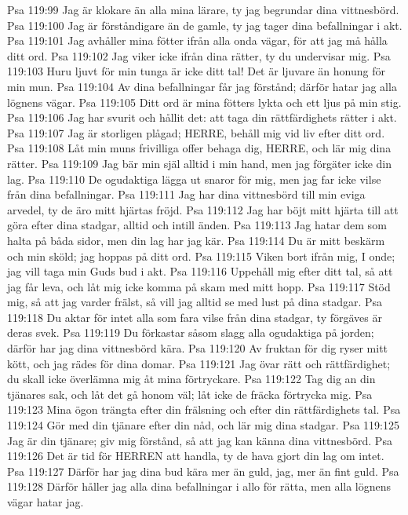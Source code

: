 Psa 119:99  Jag är klokare än alla mina lärare, ty jag begrundar dina vittnesbörd.
Psa 119:100  Jag är förståndigare än de gamle, ty jag tager dina befallningar i akt.
Psa 119:101  Jag avhåller mina fötter ifrån alla onda vägar, för att jag må hålla ditt ord.
Psa 119:102  Jag viker icke ifrån dina rätter, ty du undervisar mig.
Psa 119:103  Huru ljuvt för min tunga är icke ditt tal! Det är ljuvare än honung för min mun.
Psa 119:104  Av dina befallningar får jag förstånd; därför hatar jag alla lögnens vägar.
Psa 119:105  Ditt ord är mina fötters lykta och ett ljus på min stig.
Psa 119:106  Jag har svurit och hållit det: att taga din rättfärdighets rätter i akt.
Psa 119:107  Jag är storligen plågad; HERRE, behåll mig vid liv efter ditt ord.
Psa 119:108  Låt min muns frivilliga offer behaga dig, HERRE, och lär mig dina rätter.
Psa 119:109  Jag bär min själ alltid i min hand, men jag förgäter icke din lag.
Psa 119:110  De ogudaktiga lägga ut snaror för mig, men jag far icke vilse från dina befallningar.
Psa 119:111  Jag har dina vittnesbörd till min eviga arvedel, ty de äro mitt hjärtas fröjd.
Psa 119:112  Jag har böjt mitt hjärta till att göra efter dina stadgar, alltid och intill änden.
Psa 119:113  Jag hatar dem som halta på båda sidor, men din lag har jag kär.
Psa 119:114  Du är mitt beskärm och min sköld; jag hoppas på ditt ord.
Psa 119:115  Viken bort ifrån mig, I onde; jag vill taga min Guds bud i akt.
Psa 119:116  Uppehåll mig efter ditt tal, så att jag får leva, och låt mig icke komma på skam med mitt hopp.
Psa 119:117  Stöd mig, så att jag varder frälst, så vill jag alltid se med lust på dina stadgar.
Psa 119:118  Du aktar för intet alla som fara vilse från dina stadgar, ty förgäves är deras svek.
Psa 119:119  Du förkastar såsom slagg alla ogudaktiga på jorden; därför har jag dina vittnesbörd kära.
Psa 119:120  Av fruktan för dig ryser mitt kött, och jag rädes för dina domar.
Psa 119:121  Jag övar rätt och rättfärdighet; du skall icke överlämna mig åt mina förtryckare.
Psa 119:122  Tag dig an din tjänares sak, och låt det gå honom väl; låt icke de fräcka förtrycka mig.
Psa 119:123  Mina ögon trängta efter din frälsning och efter din rättfärdighets tal.
Psa 119:124  Gör med din tjänare efter din nåd, och lär mig dina stadgar.
Psa 119:125  Jag är din tjänare; giv mig förstånd, så att jag kan känna dina vittnesbörd.
Psa 119:126  Det är tid för HERREN att handla, ty de hava gjort din lag om intet.
Psa 119:127  Därför har jag dina bud kära mer än guld, jag, mer än fint guld.
Psa 119:128  Därför håller jag alla dina befallningar i allo för rätta, men alla lögnens vägar hatar jag.
